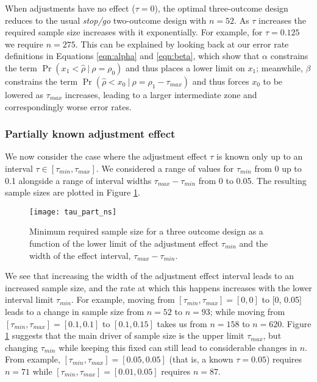 \documentclass[referee, lineno, pdflatex,sn-vancouver,Numbered]{sn-jnl}%
\theoremstyle{thmstyleone}%
\theoremstyle{thmstyletwo}%
\theoremstyle{thmstylethree}%
\begin{document}
When adjustments have no effect ($\tau = 0$), the optimal three-outcome design reduces to the usual \emph{stop/go} two-outcome design with $n = 52$. As $\tau$ increases the required sample size increases with it exponentially. For example, for $\tau = 0.125$ we require $n = 275$. This can be explained by looking back at our error rate definitions in Equations \ref{eqn:alpha} and \ref{eqn:beta}, which show that $\alpha$ constrains the term $\Pr(x_1 < \hat{\rho} ~|~ \rho = \rho_0)$ and thus places a lower limit on $x_1$; meanwhile, $\beta$ constrains the term $\Pr(\hat{\rho} < x_0 ~|~ \rho = \rho_1 - \tau_{max})$ and thus forces $x_0$ to be lowered as $\tau_{max}$ increases, leading to a larger intermediate zone and correspondingly worse error rates. 

\subsubsection{Partially known adjustment effect}

We now consider the case where the adjustment effect $\tau$ is known only up to an interval $\tau \in [\tau_{min}, \tau_{max}]$. We considered a range of values for $\tau_{min}$ from 0 up to 0.1 alongside a range of interval widths $\tau_{max} - \tau_{min}$ from 0 to 0.05. The resulting sample sizes are plotted in Figure \ref{fig:tau_part_ns}.

\begin{figure}
\centering
\texttt{[image: tau\_part\_ns]}
\caption{Minimum required sample size for a three outcome design as a function of the lower limit of the adjustment effect $\tau_{min}$ and the width of the effect interval, $\tau_{max} - \tau_{min}$.}
\label{fig:tau_part_ns}
\end{figure}

We see that increasing the width of the adjustment effect interval leads to an increased sample size, and the rate at which this happens increases with the lower interval limit $\tau_{min}$. For example, moving from $[\tau_{min}, \tau_{max}] = [0, 0]$ to [0, 0.05] leads to a change in sample size from $n = 52$ to $n = 93$; while moving from   $[\tau_{min}, \tau_{max}] = [0.1, 0.1]$ to $[0.1, 0.15]$ takes us from $n = 158$ to $n = 620$. Figure \ref{fig:tau_part_ns} suggests that the main driver of sample size is the upper limit $\tau_{max}$, but changing $\tau_{min}$ while keeping this fixed can still lead to considerable changes in $n$. From example, $[\tau_{min}, \tau_{max}] = [0.05, 0.05]$ (that is, a known $\tau = 0.05$) requires $n = 71$ while $[\tau_{min}, \tau_{max}] = [0.01, 0.05]$ requires $n = 87$.
\end{document}
